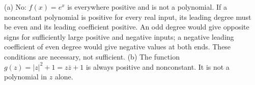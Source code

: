 (a) No: $f(x)=e^x$ is everywhere positive and is not a polynomial. If a nonconstant polynomial is positive for every real input, its leading degree must be even and its leading coefficient positive. An odd degree would give opposite signs for sufficiently large positive and negative inputs; a negative leading coefficient of even degree would give negative values at both ends. These conditions are necessary, not sufficient. (b) The function $g(z)=|z|^2+1=z\overline z+1$ is always positive and nonconstant. It is not a polynomial in $z$ alone.
